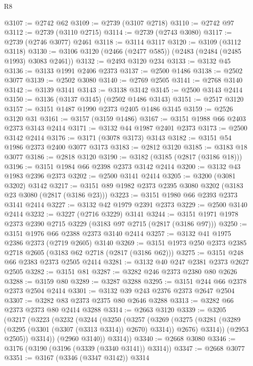 \begin{lexlean}{R8}
\begin{coremodule}
@3107 := @2742 @62
@3109 := @2739 (@3107 @2718)
@3110 := @2742 @97
@3112 := @2739 (@3110 @2715)
@3114 := @2739 (@2743 @3080)
@3117 := @2739 (@2746 @3077) @2461
@3118 := @3114 @3117
@3120 := @3109 (@3112 @3118)
@3130 := @3106 @3120 (@2466 (@2477 @585)) (@2483 (@2484 (@2485 @1993) @3083 @2461))
@3132 := @2493 @3120 @234
@3133 := @3132 @45
@3136 := @3133 @1991 @2406 @2373
@3137 := @2500 @1486
@3138 := @2502 @3077
@3139 := @2502 @3080
@3140 := @2769 @2505
@3141 := @2768 @3140
@3142 := @3139 @3141
@3143 := @3138 @3142
@3145 := @2500 @3143 @2414
@3150 := @3136 (@3137 @3145) (@2502 @1486 @3143)
@3151 := @2517 @3120
@3157 := @3151 @1487 @1990 @2373 @2405 @1486 @3145
@3159 := @2526 @3120 @31
@3161 := @3157 (@3159 @1486)
@3167 := @3151 @1988 @66 @2403 @2373 @3143 @2414
@3171 := @3132 @44 @1987 @2401 @2373
@3173 := @2500 @3142 @2414
@3176 := @3171 (@3078 @3173) @3143
@3182 := @3151 @54 @1986 @2373 @2400 @3077 @3173
@3183 := @2812 @3120
@3185 := @3183 @18 @3077
@3186 := @2818 @3120
@3190 := @3182 (@3185 (@2817 (@3186 @18)))
@3196 := @3151 @1984 @66 @2398 @2373 @3142 @2414
@3200 := @3132 @43 @1983 @2396 @2373
@3202 := @2500 @3141 @2414
@3205 := @3200 (@3081 @3202) @3142
@3217 := @3151 @89 @1982 @2373 @2395 @3080 @3202 (@3183 @23 @3080 (@2817 (@3186 @23)))
@3223 := @3151 @1980 @66 @2393 @2373 @3141 @2414
@3227 := @3132 @42 @1979 @2391 @2373
@3229 := @2500 @3140 @2414
@3232 := @3227 (@2716 @3229) @3141
@3244 := @3151 @1971 @1978 @2373 @2390 @2715 @3229 (@3183 @97 @2715 (@2817 (@3186 @97)))
@3250 := @3151 @1976 @66 @2388 @2373 @3140 @2414
@3257 := @3132 @41 @1975 @2386 @2373 (@2719 @2605) @3140
@3269 := @3151 @1973 @250 @2373 @2385 @2718 @2605 (@3183 @62 @2718 (@2817 (@3186 @62)))
@3275 := @3151 @248 @66 @2383 @2373 @2505 @2414
@3281 := @3132 @40 @247 @2381 @2373 @2627 @2505
@3282 := @3151 @81
@3287 := @3282 @246 @2373 @2380 @80 @2626
@3288 := @3159 @80
@3289 := @3287 @3288
@3295 := @3151 @244 @66 @2378 @2373 @2504 @2414
@3301 := @3132 @39 @243 @2376 @2373 @2647 @2504
@3307 := @3282 @83 @2373 @2375 @80 @2646 @3288
@3313 := @3282 @66 @2373 @2373 @80 @2414 @3288
@3314 := @2663 @3120
@3339 := @3205
    (@3217
      (@3223
        (@3232
          (@3244
            (@3250
              (@3257
                (@3269
                  (@3275
                    (@3281 (@3289 (@3295 (@3301 (@3307 (@3313 @3314)) @2670) @3314)) @2676)
                    @3314))
                (@2953 @2505))
              @3314))
          (@2960 @3140))
        @3314))
@3340 := @2668 @3080
@3346 := @3176 (@3190 (@3196 (@3339 (@3340 @3141)) @3314))
@3347 := @2668 @3077
@3351 := @3167 (@3346 (@3347 @3142)) @3314

\end{coremodule}
\end{lexlean}
